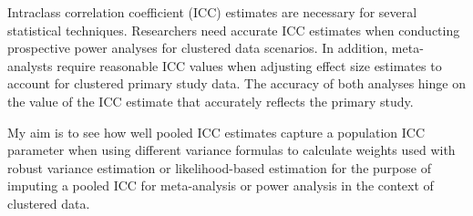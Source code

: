 


Intraclass correlation coefficient (ICC) estimates are necessary for several statistical techniques. Researchers need accurate ICC estimates when conducting prospective power analyses for clustered data scenarios. In addition, meta-analysts require reasonable ICC values when adjusting effect size estimates to account for clustered primary study data. The accuracy of both analyses hinge on the value of the ICC estimate that accurately reflects the primary study. 

My aim is to see how well pooled ICC estimates capture a population ICC parameter when using different variance formulas to calculate weights used with robust variance estimation or likelihood-based estimation for the purpose of imputing a pooled ICC for meta-analysis or power analysis in the context of clustered data.



